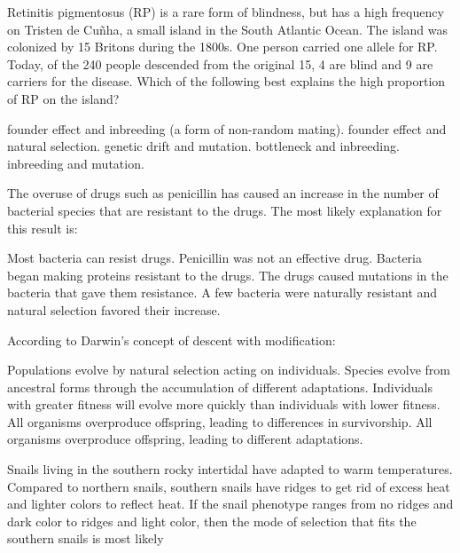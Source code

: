 \question
Retinitis pigmentosus (RP) is a rare form of blindness, but has a high frequency on Tristen de Cu\~nha, a small island in the South Atlantic Ocean.  The island was colonized by 15 Britons during the 1800s.  One person carried one allele for RP.  Today, of the 240 people descended from the original 15, 4 are blind and 9 are carriers for the disease.  Which of the following best explains the high proportion of RP on the island?

\begin{choices}
	\correctchoice founder effect and inbreeding (a form of non-random mating).%
	\choice founder effect and natural selection.%
	\choice genetic drift and mutation.%
	\choice bottleneck and inbreeding.%
	\choice inbreeding and mutation.%
\end{choices}


\question
The overuse of drugs such as penicillin has caused an increase in the number of bacterial species that are resistant to the drugs. The most likely explanation for this result is:

\begin{choices}
\choice Most bacteria can resist drugs. %
\choice Penicillin was not an effective drug. %
\choice Bacteria began making proteins resistant to the drugs. %
\choice The drugs caused mutations in the bacteria that gave them resistance. %
\correctchoice A few bacteria were naturally resistant and natural selection favored their increase. %
\end{choices}


\question
According to Darwin's concept of descent with modification:

\begin{choices}
	\choice Populations evolve by natural selection acting on individuals. %
	\correctchoice Species evolve from ancestral forms through the accumulation of different adaptations. %
	\choice Individuals with greater fitness will evolve more quickly than individuals with lower fitness. %
	\choice All organisms overproduce offspring, leading to differences in survivorship. %
	\choice All organisms overproduce offspring, leading to different adaptations. %
\end{choices}

\question
Snails living in the southern rocky intertidal have adapted to warm temperatures. Compared to northern snails, southern snails have ridges to get rid of excess heat and lighter colors to reflect heat. If the snail phenotype ranges from no ridges and dark color to ridges and light color, then the mode of selection that fits the southern snails is most likely

